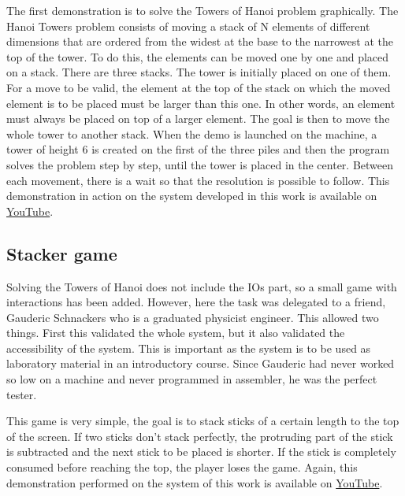 The first demonstration is to solve the Towers of Hanoi problem graphically. The Hanoi Towers 
problem consists of moving a stack of N elements of different dimensions that are ordered from the 
widest at the base to the narrowest at the top of the tower. To do this, the elements can be moved 
one by one and placed on a stack.
 There are three stacks. The tower is initially placed on one of 
them. For a move to be valid, the element at the top of the stack on which the moved element is to 
be placed must be larger than this one. In other words, an element must always be placed on top of 
a larger element. The goal is then to move the whole tower to another stack. When the demo is 
launched on the machine, a tower of height 6 is created on the first of the three piles and then 
the program solves the problem step by step, until the tower is placed in the center. Between each 
movement, there is a wait so that the resolution is possible to follow. This demonstration in 
action on the system developed in this work is available on 
\href{https://www.youtube.com/watch?v=0W0SXzncl-Q}{YouTube}.

\subsection{Stacker game}

Solving the Towers of Hanoi does not include the IOs part, so a small game with interactions has 
been added. However, here the task was delegated to a friend, 
Gauderic Schnackers who is a graduated physicist engineer. This allowed two things. First this
validated the whole system, but it also validated the accessibility of the system. This is important 
as the system is to be used as laboratory material in an introductory course. Since Gauderic had 
never worked so low on a machine and never programmed in assembler, he was the perfect tester. 

This game is very simple, the goal is to stack sticks of a certain length to the top of the screen. 
If two sticks don't stack perfectly, the protruding part of the stick is subtracted and the next 
stick to be placed is shorter. If the stick is completely consumed before reaching the top, the 
player loses the game. Again, this demonstration performed on the system of this work is available 
on \href{https://www.youtube.com/watch?v=yHJDM_ckR1g}{YouTube}.
